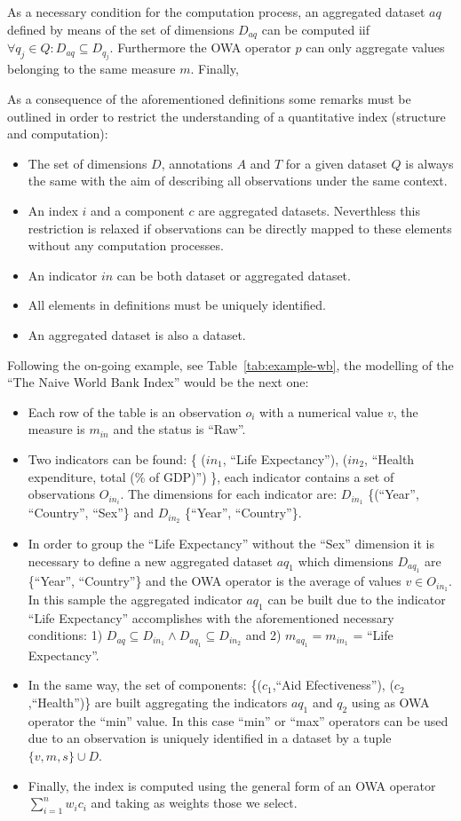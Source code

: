 As a necessary condition for the computation process, an aggregated dataset $aq$ defined by means of the set of dimensions $D_{aq}$ can be computed iif 
$\forall q_j \in Q: D_{aq} \subseteq D_{q_j}$. Furthermore the OWA operator $p$ can only aggregate values belonging to the same measure $m$. Finally, 

As a consequence of the aforementioned definitions some remarks must be outlined in order to restrict the understanding of 
a quantitative index (structure and computation):
\begin{itemize}
 \item The set of dimensions $D$, annotations $A$ and $T$ for a given dataset $Q$ is always the same with the aim of describing all observations under 
 the same context.
 \item An index $i$ and a component $c$ are aggregated datasets. Neverthless this restriction is relaxed if observations can be directly mapped to 
 these elements without any computation processes.
 \item An indicator $in$ can be both dataset or aggregated dataset.
 \item All elements in definitions must be uniquely identified. 
 \item An aggregated dataset is also a dataset.
\end{itemize}

Following the on-going example, see Table~\ref{tab:example-wb}, the modelling of the ``The Naive World Bank Index'' would be the next one:
\begin{itemize}
 \item Each row of the table is an observation $o_i$ with a numerical value $v$, the measure is $m_{in}$ and the status is ``Raw''.
 \item Two indicators can be found: \{ ($in_1$, ``Life Expectancy''), ($in_2$, ``Health expenditure, total (\% of GDP)'') \}, each indicator contains a set 
 of observations $O_{in_i}$. The dimensions for each indicator are: $D_{in_1}$  \{(``Year'', ``Country'', ``Sex''\} and $D_{in_2}$ \{``Year'', ``Country''\}.
 \item In order to group the ``Life Expectancy'' without the ``Sex'' dimension it is necessary to define a new aggregated dataset $aq_1$ which 
 dimensions $D_{aq_1}$ are \{``Year'', ``Country''\} and the OWA operator is the average of values $v \in O_{in_1}$. In this sample the aggregated indicator $aq_1$
 can be built due to the indicator ``Life Expectancy'' accomplishes with the aforementioned necessary conditions: 1) $D_{aq} \subseteq D_{in_1} \wedge D_{aq_1} \subseteq D_{in_2}$ and 
 2) $m_{aq_1}= m_{in_1}$ = ``Life Expectancy''.
 \item In the same way, the set of components: \{($c_1$,``Aid Efectiveness''), ($c_2$,``Health'')\} are built aggregating the indicators $aq_1$ and 
 $q_2$ using as OWA operator the ``min'' value. In this case ``min'' or ``max'' operators can be used due to an observation is uniquely identified in a 
 dataset by a tuple $\{v,m,s\} \cup D$.
 \item Finally, the index is computed using the general form of an OWA operator $\sum_{i=1}^n  w_i c_i$ and taking as weights those we select.
\end{itemize}

